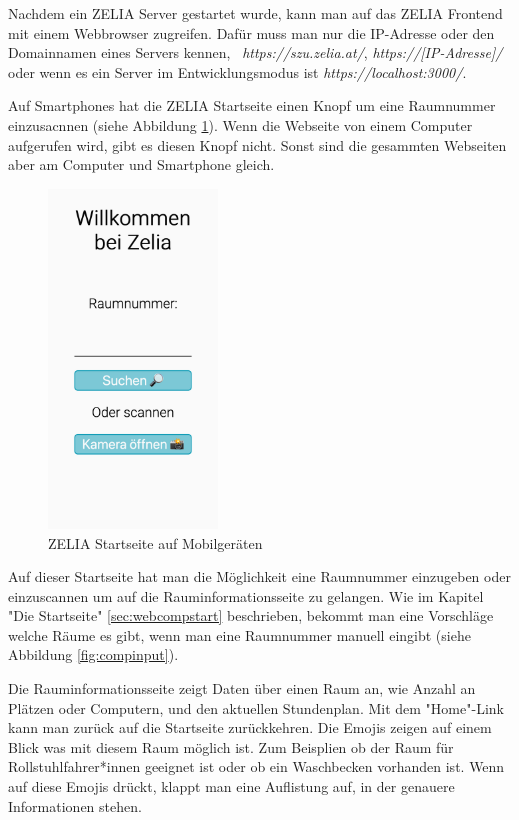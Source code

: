 Nachdem ein ZELIA Server gestartet wurde, kann man auf das ZELIA Frontend mit einem Webbrowser zugreifen. Dafür muss man nur die IP-Adresse oder den Domainnamen eines Servers kennen, \zb\ \emph{https://szu.zelia.at/}, \emph{https://[IP-Adresse]/} oder wenn es ein Server im Entwicklungsmodus ist \emph{https://localhost:3000/}.

Auf Smartphones hat die ZELIA Startseite einen Knopf um eine Raumnummer einzusacnnen (siehe Abbildung \ref{fig:zeliastart}). Wenn die Webseite von einem Computer aufgerufen wird, gibt es diesen Knopf nicht. Sonst sind die gesammten Webseiten aber am Computer und Smartphone gleich.

\begin{figure}[H]
    \centering
    \includegraphics[height=90mm]{media/Handbuch/zelia_start.png}
    \caption{ZELIA Startseite auf Mobilgeräten}
    \label{fig:zeliastart}
\end{figure}

Auf dieser Startseite hat man die Möglichkeit eine Raumnummer einzugeben oder einzuscannen um auf die Rauminformationsseite zu gelangen. Wie im Kapitel "Die Startseite" \ref{sec:webcompstart} beschrieben, bekommt man eine Vorschläge welche Räume es gibt, wenn man eine Raumnummer manuell eingibt (siehe Abbildung \ref{fig:compinput}). 

Die Rauminformationsseite zeigt Daten über einen Raum an, wie Anzahl an Plätzen oder Computern, und den aktuellen Stundenplan. Mit dem "Home"-Link kann man zurück auf die Startseite zurückkehren. Die Emojis zeigen auf einem Blick was mit diesem Raum möglich ist. Zum Beisplien ob der Raum für Rollstuhlfahrer*innen geeignet ist oder ob ein Waschbecken vorhanden ist. Wenn auf diese Emojis drückt, klappt man eine Auflistung auf, in der genauere Informationen stehen.

